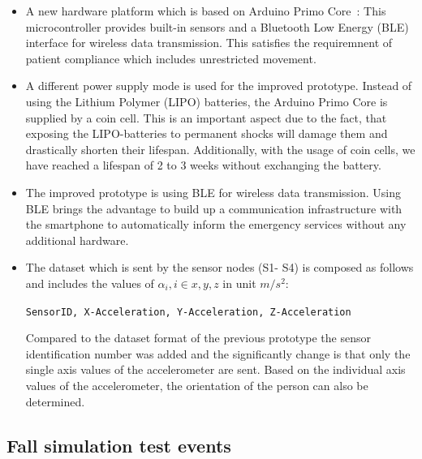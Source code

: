 \documentclass[journal]{IEEEtran}
\begin{document}
\begin{itemize}
 \item A new hardware platform which is based on Arduino Primo Core~\cite{Arduino2018}: 
 This microcontroller provides built-in sensors and a Bluetooth Low Energy (BLE) 
 interface for wireless data transmission. This satisfies the
 requiremnent of patient compliance
 which includes unrestricted movement.
 \item A different power supply mode is used for the improved prototype. Instead of 
 using the Lithium Polymer (LIPO) batteries, the Arduino Primo Core is supplied by a 
 coin cell. This is an important aspect due to the fact, that exposing the LIPO-batteries 
 to permanent shocks will damage them and drastically shorten their lifespan. 
 Additionally, with the usage of coin cells, we have reached a lifespan of 2 to 3 weeks 
 without exchanging the battery.
 \item The improved prototype is using BLE for wireless data transmission. Using BLE 
 brings the advantage to build up a communication infrastructure with the smartphone 
 to automatically inform the emergency services without any additional hardware.
 \item The dataset which is sent by the sensor nodes (S1- S4) is composed as follows 
 and includes the values of $\alpha_{i}, i \in {x,y,z}$ in unit $m/s^{2}$:
 \begin{center}
  \texttt{\small{SensorID, X-Acceleration, Y-Acceleration, Z-Acceleration}}
 \end{center}
 Compared to the dataset format of the previous prototype the sensor identification 
 number was added and the significantly change is that only the single axis values of 
 the accelerometer are sent. Based on the individual axis values of the accelerometer, 
 the orientation of the person can also be determined. 
\end{itemize}

\subsection{Fall simulation test events}
\end{document}
